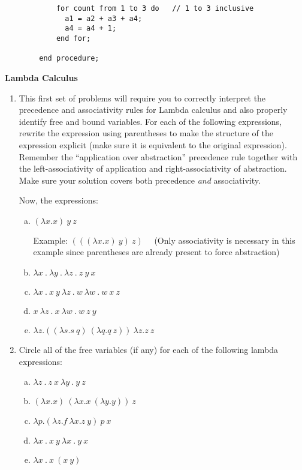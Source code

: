 \documentclass{exam}
\begin{document}
\begin{questions}
\begin{verbatim}
            for count from 1 to 3 do   // 1 to 3 inclusive
              a1 = a2 + a3 + a4;
              a4 = a4 + 1;
            end for;
        	
        end procedure;
\end{verbatim}

\newpage

\question[25] \textbf{Lambda Calculus}
\begin{enumerate}
\item This first set of problems will require you to correctly interpret the precedence and associativity rules for
Lambda calculus and also properly identify 
free and bound variables.  For each of the following expressions, rewrite the expression using parentheses to make the 
structure of the expression explicit (make sure it is equivalent to the original expression).  
Remember the ``application over abstraction'' precedence rule together with the left-associativity of application and 
right-associativity of abstraction.  Make sure your solution covers both precedence \emph{and} associativity.

Now, the expressions:

\begin{enumerate}[a.]
\item $(\lambda x.x)~y~z$

{\color{red} Example: $(((\lambda x.x)~ y)~ z)$ ~~(Only associativity is necessary in this example since parentheses are already present to force abstraction)}


\item $\lambda x~ .~\lambda y~ .~\lambda z~ .~ z~y~x$

\item $\lambda x~ .~ x ~y~ \lambda z~ .~ w~ \lambda w~ .~ w~ x~ z$

\item $x~ \lambda z~ .~ x~ \lambda w~ .~ w~ z~ y$
	
\item $\lambda z . ((\lambda s . s ~q)~ (\lambda q . q ~z))~ \lambda z . z ~z$

\end{enumerate}

\item Circle all of the free variables (if any) for each of the following lambda expressions:

\begin{enumerate}[a.]
\item $\lambda z ~.~ z~ x~ \lambda y~ .~ y~ z$
\item $(\lambda x . x)~ (\lambda x . x~ (\lambda y . y)) ~z$
\item $\lambda p . (\lambda z . f~ \lambda x . z~ y) ~p ~x$
\item $\lambda x~ .~ x~ y~ \lambda x~ .~ y~ x$
\item $\lambda x~ .~ x~ (x~y)$
\end{enumerate}



\end{enumerate}
\end{questions}
\end{document}
